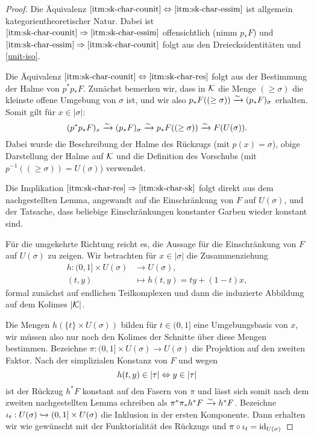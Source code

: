 \begin{proof}
  Die Äquivalenz $\ref{itm:sk-char-counit} \Leftrightarrow
  \ref{itm:sk-char-essim}$ ist allgemein kategorientheoretischer
  Natur. Dabei ist $\ref{itm:sk-char-counit} \Rightarrow
  \ref{itm:sk-char-essim}$ offensichtlich (nimm $p_* F$) und
  $\ref{itm:sk-char-essim} \Rightarrow \ref{itm:sk-char-counit}$ folgt
  aus den Dreiecksidentitäten und \ref{unit-iso}.

  Die Äquivalenz $\ref{itm:sk-char-counit} \Leftrightarrow \ref{itm:sk-char-res}$
  folgt aus der Bestimmung der Halme von $p^*p_* F$. Zunächst bemerken
  wir, dass in $\mathcal{K}$ die Menge $(\geq \sigma)$ die kleinste offene
  Umgebung von $\sigma$ ist, und wir also $p_*F((\geq \sigma)) \xrightarrow[]{\sim}
  (p_*F)_{\sigma}$ erhalten. Somit gilt für $x \in |\sigma|$:
  \begin{equation}\label{eq:counit-sect}
    (p^*p_*F)_x \xrightarrow[]{\sim} (p_*F)_{\sigma} \xrightarrow[]{\sim} p_*F((\geq \sigma)) \xrightarrow[]{\sim} F(U(\sigma)).  
  \end{equation}  
  Dabei wurde die Beschreibung der Halme des Rückzugs (mit $p(x) =
  \sigma$), obige Darstellung der Halme auf $\mathcal{K}$ und die Definition
  des Vorschubs (mit $p^{-1}((\geq \sigma)) = U(\sigma)$) verwendet.

  Die Implikation $\ref{itm:sk-char-res} \Rightarrow
  \ref{itm:sk-char-sk}$ folgt direkt aus dem nachgestellten Lemma,
  angewandt auf die Einschränkung von $F$ auf $U(\sigma)$, und der
  Tatsache, dass beliebige Einschränkungen konstanter Garben wieder
  konstant sind.

  Für die umgekehrte Richtung reicht es, die Aussage für die
  Einschränkung von $F$ auf $U(\sigma)$ zu zeigen.  Wir betrachten für
  $x \in |\sigma|$ die Zusammenziehung
  \begin{align*}
    h: (0, 1] \times U(\sigma) &\to U(\sigma), \\
    (t, y) &\mapsto h(t, y) = t y + (1 - t) x,
  \end{align*}
  formal zunächst auf endlichen Teilkomplexen und dann die induzierte
  Abbildung auf dem Kolimes $|\mathcal{K}|$.
  
  Die Mengen $h(\{t\} \times U(\sigma))$ bilden für $t \in (0, 1]$
  eine Umgebungsbasis von $x$, wir müssen also nur noch den Kolimes
  der Schnitte über diese Mengen bestimmen. Bezeichne $\pi: (0, 1]
  \times U(\sigma) \to U(\sigma)$ die Projektion auf den zweiten
  Faktor. Nach der simplizialen Konstanz von $F$ und wegen
  \[ h(t, y) \in |\tau| \Leftrightarrow y \in |\tau| \]
  ist der Rückzug $h^* F$ konstant auf den Fasern von $\pi$ und lässt
  sich somit nach dem zweiten nachgestellten Lemma schreiben als
  $\pi^* \pi_* h^* F \xrightarrow[]{\sim} h^* F$. Bezeichne $\iota_t: U(\sigma)
  \xhookrightarrow{} (0, 1] \times U(\sigma)$ die Inklusion in der
    ersten Komponente. Dann erhalten wir wie gewünscht mit der
    Funktorialität des Rückzugs und $\pi \circ \iota_t =
    \operatorname{id}_{U(\sigma)}$


\end{proof}
